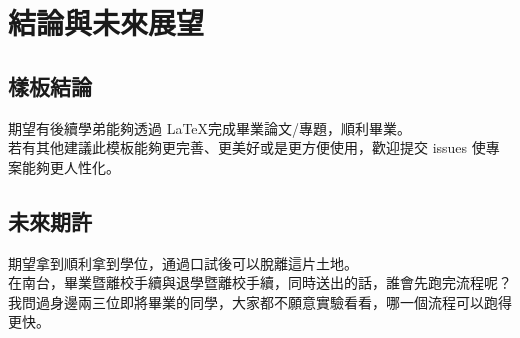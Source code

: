 
\chapter{結論與未來展望}\label{conclusion}

\section{樣板結論}

期望有後續學弟能夠透過 \LaTeX 完成畢業論文/專題，順利畢業。\\
若有其他建議此模板能夠更完善、更美好或是更方便使用，歡迎提交 issues 使專案能夠更人性化。

\section{未來期許}

期望拿到順利拿到學位，通過口試後可以脫離這片土地。\\
在南台，畢業暨離校手續與退學暨離校手續，同時送出的話，誰會先跑完流程呢？我問過身邊兩三位即將畢業的同學，大家都不願意實驗看看，哪一個流程可以跑得更快。
